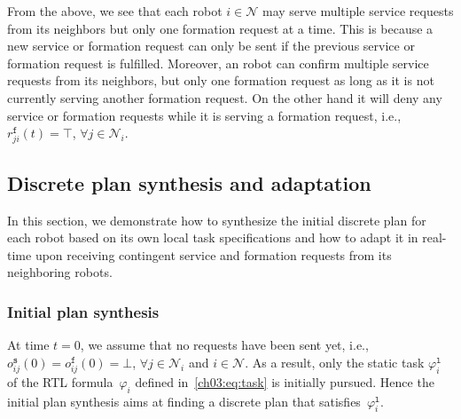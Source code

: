 From the above, we see that each robot $i\in\mathcal{N}$ may serve multiple service requests from its neighbors but only one formation request at a time.
This is because a new service or formation request can only be sent if the previous service or formation request is fulfilled.
Moreover, an robot can confirm multiple service requests from its neighbors, but only one formation request as long as it is not currently serving another formation request. On the other hand it will deny any service or formation requests while it is serving a formation request, i.e., $r^{\texttt{f}}_{ji}(t)=\top$, $\forall j\in \mathcal{N}_i$.



\subsection{Discrete plan synthesis and adaptation}
In this section, we demonstrate how to synthesize the initial discrete plan for each robot based on its own local task specifications and how to adapt it in real-time upon receiving contingent service and formation requests from its neighboring robots.

\subsubsection{Initial plan synthesis}\label{ch03:sec:synthesis}
At time $t=0$, we assume that no requests have been sent yet, i.e., $o^\texttt{s}_{ij}(0)=o^\texttt{f}_{ij}(0)=\bot$, $\forall j\in \mathcal{N}_i$ and $i\in \mathcal{N}$.
As a result, only the static task $\varphi_{i}^\texttt{l}$ of the RTL formula~$\varphi_i$ defined in~\eqref{ch03:eq:task} is initially pursued.
Hence the initial plan synthesis aims at finding a discrete plan that satisfies~$\varphi_i^\texttt{l}$.

